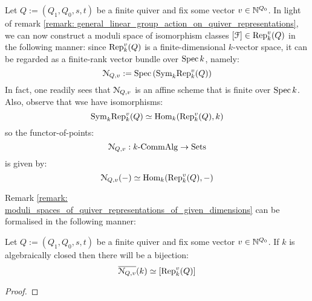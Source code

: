             \begin{remark} \label{remark: moduli_spaces_of_quiver_representations_of_given_dimensions} 
                Let $Q := (Q_1, Q_0, s, t)$ be a finite quiver and fix some vector $v \in \mathbb{N}^{Q_0}$. In light of remark \ref{remark: general_linear_group_action_on_quiver_representations}, we can now construct a moduli space of isomorphism classes $[\mathcal{F}] \in \mathrm{Rep}_k^v(Q)$ in the following manner: since $\mathrm{Rep}_k^v(Q)$ is a finite-dimensional $k$-vector space, it can be regarded as a finite-rank vector bundle over $\operatorname{Spec} k$, namely:
                    $$\mathcal{N}_{Q, v} := \operatorname{Spec}\left( \mathrm{Sym}_k \mathrm{Rep}_k^v(Q) \right)$$
                In fact, one readily sees that $\mathcal{N}_{Q, v}$ is an affine scheme that is finite over $\operatorname{Spec} k$. Also, observe that wse have isomorphisms:
                    $$\mathrm{Sym}_k \mathrm{Rep}_k^v(Q) \simeq \mathrm{Hom}_k(\mathrm{Rep}_k^v(Q), k)$$
                so the functor-of-points:
                    $$\mathcal{N}_{Q, v}: k\text{-}\mathrm{Comm}\mathrm{Alg} \to \mathrm{Sets}$$
                is given by:
                    $$\mathcal{N}_{Q, v}(-) \simeq \mathrm{Hom}_k(\mathrm{Rep}_k^v(Q), -)$$
            \end{remark}
            Remark \ref{remark: moduli_spaces_of_quiver_representations_of_given_dimensions} can be formalised in the following manner:
            \begin{proposition}[]
                Let $Q := (Q_1, Q_0, s, t)$ be a finite quiver and fix some vector $v \in \mathbb{N}^{Q_0}$. If $k$ is algebraically closed then there will be a bijection:
                    $$\overline{\mathcal{N}_{Q, v}}(k) \simeq [\mathrm{Rep}_k^v(Q)]$$
            \end{proposition}
                \begin{proof}
                    
                \end{proof}
            
